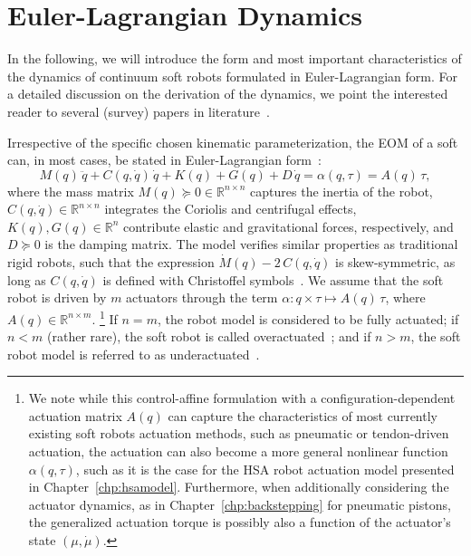 \section{Euler-Lagrangian Dynamics}\label{sec:background:dynamics}
In the following, we will introduce the form and most important characteristics of the dynamics of continuum soft robots formulated in Euler-Lagrangian form.
For a detailed discussion on the derivation of the dynamics, we point the interested reader to several (survey) papers in literature~\citep{gazzola2018forward, armanini2023soft, alessi2024rod, della2023model}.

Irrespective of the specific chosen kinematic parameterization, the \gls{EOM} of a soft can, in most cases, be stated in Euler-Lagrangian form~\citep{della2023model}:
\begin{equation}\label{eq:background:dynamics:eom}
    M(q) \, \ddot{q} + C(q, \dot{q}) \, \dot{q} + K(q) + G(q) + D \, \dot{q} = \alpha(q,\tau) = A(q) \, \tau,
\end{equation}
where the mass matrix $M(q) \succeq 0 \in \mathbb{R}^{n \times n}$
captures the inertia of the robot, $C(q,\dot{q}) \in \mathbb{R}^{n \times n}$ integrates the Coriolis and centrifugal effects, $K(q), G(q) \in \mathbb{R}^{n}$ contribute elastic and gravitational forces, respectively, and $D \succeq 0$ is the damping matrix.
The model verifies similar properties as traditional rigid robots, such that the expression $\dot{M}(q) - 2 \, C(q,\dot{q})$ is skew-symmetric, as long as $C(q,\dot{q})$ is defined with Christoffel symbols~\citep{della2020model}.
We assume that the soft robot is driven by $m$ actuators through the term $\alpha: q \times \tau \mapsto A(q) \, \tau$, where $A(q) \in \mathbb{R}^{n \times m}$. \footnote{We note while this control-affine formulation with a configuration-dependent actuation matrix $A(q)$ can capture the characteristics of most currently existing soft robots actuation methods, such as pneumatic or tendon-driven actuation, the actuation can also become a more general nonlinear function $\alpha(q,\tau)$, such as it is the case for the \gls{HSA} robot actuation model presented in Chapter~\ref{chp:hsamodel}. Furthermore, when additionally considering the actuator dynamics, as in Chapter~\ref{chp:backstepping} for pneumatic pistons, the generalized actuation torque is possibly also a function of the actuator's state $(\mu,\dot{\mu})$.}
If $n=m$, the robot model is considered to be fully actuated; if $n < m$ (rather rare), the soft robot is called overactuated~\citep{pustina2024input}; and if $n > m$, the soft robot model is referred to as underactuated~\citep{pustina2025analysis}.

